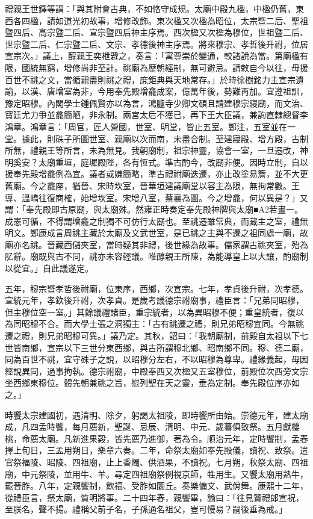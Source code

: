 \begin{pinyinscope}
禮親王世鐸等謂：「與其附會古典，不如恪守成規。太廟中殿九楹，中楹仍舊，東西各四楹，請如道光初故事，增修改飾。東次楹又次楹為昭位，太宗暨二后、聖祖暨四后、高宗暨二后、宣宗暨四后神主序焉。西次楹又次楹為穆位，世祖暨二后、世宗暨二后、仁宗暨二后、文宗、孝德後神主序焉。將來穆宗、孝哲後升祔，位居宣宗次。」議上，醇親王奕枻韙之，奏言：「寓尊崇於變通，較諸說為當。第廟楹有限，國統無窮，增修尚非至計。祧廟為歷朝經制，無可避忌。請敕自今以往，毋援百世不祧之文，當循親盡則祧之禮，庶鉅典與天地常存。」於時徐樹銘力主宣宗遺諭，以漢、唐增室為非，今用奉先殿增龕成案，億萬年後，勢難再加。宜遵祖訓，豫定昭穆。內閣學士鍾佩賢亦以為言，鴻臚寺少卿文碩且請建穆宗寢廟，而文治、寶廷尤力爭並龕簡陋，非永制。兩宮太后不獲已，再下王大臣議，兼詢直隸總督李鴻章。鴻章言：「周官，匠人營國，世室、明堂，皆止五室。鄭注，五室並在一堂。據此，則硃子所圖世室、親廟以次而南，未盡合制。至建寢殿、增方殿，古制所無，禮親王等所言，未為無見。我朝廟制，祖宗神靈，協會一室，一旦遷改，神明奚安？太廟重垣，庭墀殿陛，各有恆式。準古酌今，改廟非便。因時立制，自以援奉先殿增龕例為宜。議者或嫌簡略，準古禮祔廟迭遷，亦止改塗易簷，並不大更舊廟。今之龕座，猶晉、宋時坎室，晉華垣建議廟堂以容主為限，無拘常數。王導、溫嶠往復商榷，始增坎室。宋增八室，蔡襄為圖。今之增龕，何以異是？」又謂：「奉先殿即古原廟，與太廟殊。然雍正時奏定奉先殿神牌與太廟■A2若畫一。成憲可循，不得謂增龕之制獨不可仿行太廟也。至祧遷雖常典，而藏主之室，禮無明文。鄭康成言周祧主藏於太廟及文武世室，是已祧之主與不遷之祖同處一廟，故廟亦名祧。晉藏西儲夾室，當時疑其非禮，後世緣為故事。儒家謂古祧夾室，殆為肊辭。廟既與古不同，祧亦未容輕議。唯醇親王所陳，為能導皇上以大讓，酌廟制以從宜。」自此議遂定。

五年，穆宗暨孝哲後祔廟，位東序，西鄉，次宣宗。七年，孝貞後升祔，次孝德。宣統元年，孝欽後升祔，次孝貞。是歲考議德宗祔廟事，禮臣言：「兄弟同昭穆，但主穆位空一室。」其餘議禮諸臣，重宗統者，以為異昭穆不便；重皇統者，復以為同昭穆不合。而大學士張之洞獨主：「古有祧遷之禮，則兄弟昭穆宜同。今無祧遷之禮，則兄弟昭穆可異。」議乃定。其秋，詔曰：「我朝廟制，前殿自太祖以下七世皆南鄉，宣宗以下三世分東西鄉，與古所謂穆北鄉、昭南鄉不同。穆、德二廟，同為百世不祧，宜守硃子之說，以昭穆分左右，不以昭穆為尊卑。禮緣義起，毋因經說異同，過事拘執。德宗祔廟，中殿奉西又次楹又五室穆位，前殿位次西旁文宗坐西鄉東穆位。體先朝兼祧之旨，慰列聖在天之靈，垂為定制。奉先殿位序亦如之。」

時饗太宗建國初，遇清明、除夕，躬謁太祖陵，即時饗所由始。崇德元年，建太廟成，凡四孟時饗，每月薦新，聖誕、忌辰、清明、中元、歲暮俱致祭。五月獻櫻桃，命薦太廟。凡新進果穀，皆先薦乃進御，著為令。順治元年，定時饗制，孟春擇上旬日，三孟用朔日，樂章六奏。二年，命祭太廟如奉先殿儀，讀祝、致祭。遣官祭福陵、昭陵、四祖廟，止上香燭、供酒果，不讀祝。七月朔，秋祭太廟、四祖廟，中元祭陵，並用牛、羊。尋定四祖廟祭例視京師，牲用生。又饗太廟用熟牛，罷晉胙。八年，定親饗制，飲福、受胙如圜丘。奏樂備文、武佾舞。康熙十二年，從禮臣言，祭太廟，質明將事。二十四年春，親饗畢，諭曰：「往見贊禮郎宣祝，至朕名，聲不揚。禮稱父前子名，子孫通名祖父，豈可慢易？嗣後垂為戒。」


\end{pinyinscope}
